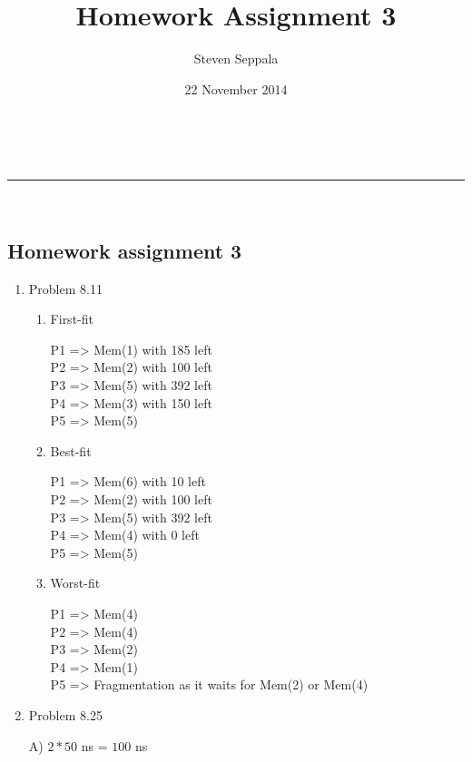 \documentclass[a4paper,11pt]{article}
\makeatletter
\newcommand{\linia}{\rule{\linewidth}{0.5pt}}
\theoremstyle{mytheor}
\renewcommand{\maketitle}{
\begin{center}
\vspace{2ex}
{\huge \textsc{\@title}}
\vspace{1ex}
\\
\linia\\
\@author \hfill \@date
\vspace{4ex}
\end{center}
}
\makeatother
\begin{document}
\title{Homework Assignment \textnumero{} 3}

\author{Steven Seppala}

\date{22 November 2014}

\maketitle

\begin{center} \section*{Homework assignment 3} \end{center}

\begin{enumerate}
\item {Problem 8.11} 
    \par 
    \begin{enumerate}
    \item First-fit\par
        P1 => Mem(1) with 185 left\\
        P2 => Mem(2) with 100 left \\
        P3 => Mem(5) with 392 left\\
        P4 => Mem(3) with 150 left\\
        P5 => Mem(5)\\
    \item Best-fit \par
        P1 => Mem(6) with 10 left\\
        P2 => Mem(2) with 100 left\\
        P3 => Mem(5) with 392 left\\
        P4 => Mem(4) with 0 left\\
        P5 => Mem(5)\\
    \item Worst-fit \par
        P1 => Mem(4)\\
        P2 => Mem(4)\\
        P3 => Mem(2)\\
        P4 => Mem(1)\\
        P5 => Fragmentation as it waits for Mem(2) or Mem(4)\\
    \end{enumerate}
\item {Problem 8.25}
    \par 
    A) $2* 50$ ns = $100$ ns \\

\end{enumerate}
\end{document}

